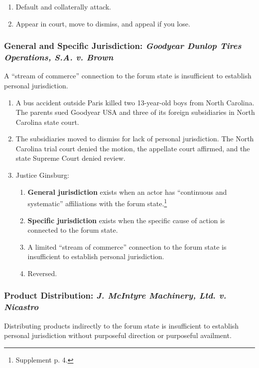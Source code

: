 \begin{enumerate}
    \item Default and collaterally attack.
    \item Appear in court, move to dismiss, and appeal if you lose.
\end{enumerate}

\subsubsection{General and Specific Jurisdiction: \emph{Goodyear Dunlop Tires 
Operations, S.A. v. Brown}} %
 
A ``stream of commerce'' connection to the forum state is insufficient to 
establish personal jurisdiction.

\begin{enumerate}
    \item A bus accident outside Paris killed two 13-year-old boys from North 
    Carolina. The parents sued Goodyear USA and three of its foreign 
    subsidiaries in North Carolina state court.
    \item The subsidiaries moved to dismiss for lack of personal jurisdiction. The North Carolina 
    trial court denied the motion, the appellate court affirmed, and the state 
    Supreme Court denied review.
    \item Justice Ginsburg:
    \begin{enumerate}
        \item \textbf{General jurisdiction} exists when an actor has 
        ``continuous and systematic'' affiliations with the forum 
        state.\footnote{Supplement p. 4.}
        \item \textbf{Specific jurisdiction} exists when the specific cause of 
        action is connected to the forum state.
        \item A limited ``stream of commerce'' connection to the forum state 
        is insufficient to establish personal jurisdiction.
        \item Reversed.
    \end{enumerate}
\end{enumerate}

\subsubsection{Product Distribution: \emph{J. McIntyre Machinery, Ltd. v. Nicastro}}

Distributing products indirectly to the forum state is insufficient to 
establish personal jurisdiction without purposeful direction or purposeful 
availment.

